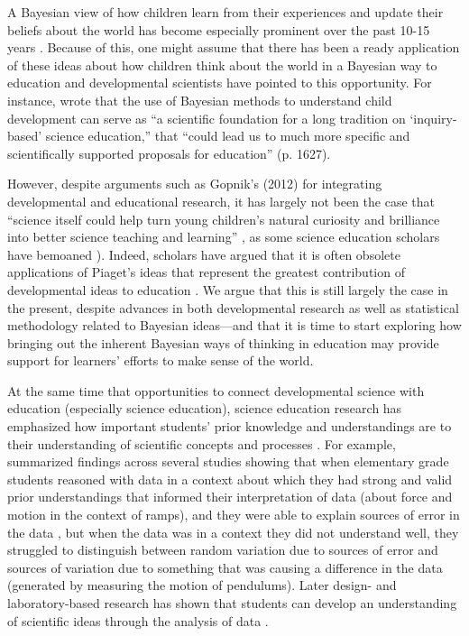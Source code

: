 \documentclass[man]{apa7}
\begin{document}
A Bayesian view of how children learn from their experiences and update their beliefs about the world has become especially prominent over the past 10-15 years \parencite{gt07, gw12}. Because of this, one might assume that there has been a ready application of these ideas about how children think about the world in a Bayesian way to education and developmental scientists have pointed to this opportunity. For instance, \textcite{g12} wrote that the use of Bayesian methods to understand child development can serve as “a scientific foundation for a long tradition on ‘inquiry-based’ science education,” that “could lead us to much more specific and scientifically supported proposals for education” (p. 1627). 

However, despite arguments such as Gopnik's (2012) for integrating developmental and educational research, it has largely not been the case that “science itself could help turn young children’s natural curiosity and brilliance into better science teaching and learning” \textcite[p. 1627]{g12}, as some science education scholars have bemoaned \parencite{ls15}). Indeed, scholars have argued that it is often obsolete applications of Piaget’s ideas \parencite[e.g., ][]{pi69} that represent the greatest contribution of developmental ideas to education \textcite{ls07}. We argue that this is still largely the case in the present, despite advances in both developmental research as well as statistical methodology related to Bayesian ideas—and that it is time to start exploring how bringing out the inherent Bayesian ways of thinking in education may provide support for learners’ efforts to make sense of the world.

At the same time that opportunities to connect developmental science with education (especially science education), science education research has emphasized how important students' prior knowledge and understandings are to their understanding of scientific concepts and processes \parencite[e.g., ][]{ssc07}. For example, \textcite{mkm07} summarized findings across several studies showing that when elementary grade students reasoned with data in a context about which they had strong and valid prior understandings that informed their interpretation of data (about force and motion in the context of ramps), and they were able to explain sources of error in the data \parencite{mk03}, but when the data was in a context they did not understand well, they struggled to distinguish between random variation due to sources of error and sources of variation due to something that was causing a difference in the data (generated by measuring the motion of pendulums). Later design- and laboratory-based research has shown that students can develop an understanding of scientific ideas through the analysis of data \parencite{ls04,mkk17}.
\end{document}
